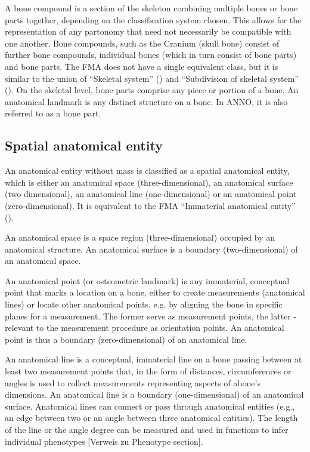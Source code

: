 \documentclass[sw]{iosart2x}
\begin{document}
A bone compound is a section of the skeleton combining multiple bones or bone parts together, depending on the classification system chosen.
This allows for the representation of any partonomy that need not necessarily be compatible with one another.
Bone compounds, such as the Cranium (skull bone) consist of further bone compounds, individual bones (which in turn consist of bone parts) and bone parts.
The FMA does not have a single equivalent class, but it is similar to the union of \enquote{Skeletal system} () and \enquote{Subdivision of skeletal system} ().
On the skeletal level, bone parts comprise any piece or portion of a bone.
An anatomical landmark is any distinct structure on a bone.
In ANNO, it is also referred to as a bone part.


\subsection{Spatial anatomical entity}
An anatomical entity without mass is classified as a spatial anatomical entity, which is either an anatomical space (three-dimensional), an anatomical surface (two-dimensional), an anatomical line (one-dimensional) or an anatomical point (zero-dimensional).
It is equivalent to the FMA \enquote{Immaterial anatomical entity} ().

An anatomical space is a space region (three-dimensional) occupied by an anatomical structure.
An anatomical surface is a boundary (two-dimensional) of an anatomical space.

An anatomical point (or osteometric landmark) is any immaterial, conceptual point that marks a location on a bone, either to create measurements (anatomical lines) or locate other anatomical points, e.g. by aligning the bone in specific planes for a measurement.
The former serve as measurement points, the latter - relevant to the measurement procedure as orientation points.
An anatomical point is thus a boundary (zero-dimensional) of an anatomical line.

An anatomical line is a conceptual, immaterial line on a bone passing between at least two measurement points that, in the form of distances, circumferences or angles is used to collect measurements representing aspects of abone’s dimensions.
An anatomical line is a boundary (one-dimensional) of an anatomical surface.
Anatomical lines can connect or pass through anatomical entities (e.g., an edge between two or an angle between three anatomical entities).
The length of the line or the angle degree can be measured and used in functions to infer individual phenotypes [Verweis zu Phenotype section].
\end{document}
